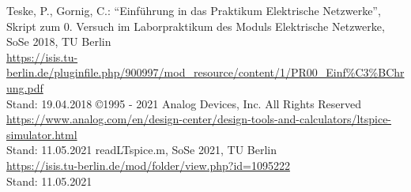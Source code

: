 %
\begin{sloppy}
\begin{small}
\begin{onehalfspacing}
  \begin{thebibliography}{--------------------} %
    Teske, P., Gornig, C.: "`Einführung in das Praktikum Elektrische Netzwerke"', Skript zum 0. Versuch im Laborpraktikum des Moduls Elektrische Netzwerke, SoSe 2018, TU Berlin\\
    \url{https://isis.tu-berlin.de/pluginfile.php/900997/mod_resource/content/1/PR00_Einf\%C3\%BChrung.pdf}\\
    Stand: 19.04.2018
    \copyright 1995 - 2021 Analog Devices, Inc. All Rights Reserved\\
    \url{https://www.analog.com/en/design-center/design-tools-and-calculators/ltspice-simulator.html}\\
    Stand: 11.05.2021
    readLTspice.m, SoSe 2021, TU Berlin\\
    \url{https://isis.tu-berlin.de/mod/folder/view.php?id=1095222}\\
    Stand: 11.05.2021
%
%
  \end{thebibliography}
\end{onehalfspacing}
\end{small}
\end{sloppy}
